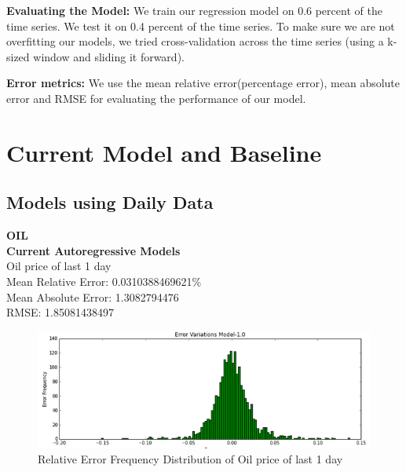 \documentclass[runningheads]{llncs}
\begin{document}
\textbf{Evaluating the Model:} We train our regression model on 0.6 percent of the time series. We test it on 0.4 percent of the time series. To make sure we are not overfitting our models, we tried cross-validation across the time series (using a k-sized window and sliding it forward). 

\textbf{Error metrics:} We use the mean relative error(percentage error), mean absolute error and RMSE for evaluating the performance of our model. 

\section{Current Model and Baseline}

\subsection{Models using Daily Data}

\noindent\textbf{OIL} \\

\noindent\textbf{Current Autoregressive Models} \\
Oil price of last 1 day\\
Mean Relative Error: 0.0310388469621\% \\
Mean Absolute Error:  1.3082794476 \\
RMSE:  1.85081438497 \\
\begin{figure}
\centering
\includegraphics[width=\textwidth]{OilLast1_Daily.png}
\caption{Relative Error Frequency Distribution of Oil price of last 1 day}
\label{fig:OilLast1_Daily.png}
\end{figure}
\end{document}
